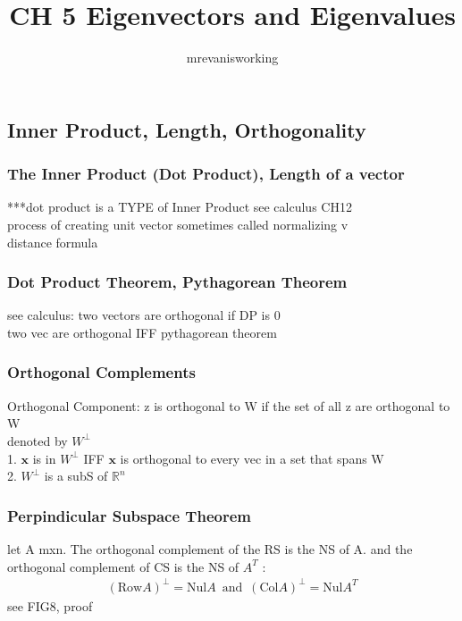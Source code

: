 \documentclass[12pt]{article}
\newcommand{\R}{\mathbb{R}}
\begin{document}
\title{CH 5 Eigenvectors and Eigenvalues}
\author{mrevanisworking}
\maketitle

\subsection{Inner Product, Length, Orthogonality}
    \subsubsection{The Inner Product (Dot Product), Length of a vector}
        ***dot product is a TYPE of Inner Product
        see calculus CH12\\
        process of creating unit vector sometimes called
        normalizing v\\
        distance formula 
    \subsubsection{Dot Product Theorem, Pythagorean Theorem}
        see calculus: two vectors are orthogonal if DP is 0 \\
        two vec are orthogonal IFF pythagorean theorem
    \subsubsection{Orthogonal Complements}
        Orthogonal Component: z is orthogonal to W if the set of all 
        z are orthogonal to W \\
        denoted by $W^\perp$ \\
        1. $\bm{x}$  is in $W^\perp$  IFF $\bm{x}$  is orthogonal to
        every vec in a set that spans W \\
        2. $W^{\perp}$  is a subS of $\R^n$  
    \subsubsection{Perpindicular Subspace Theorem}
        let A mxn. The orthogonal complement of the RS is the
        NS of A. and the orthogonal complement of CS is the NS of $A^T$ :
        \begin{align*}
            (\text{Row}A)^\perp = \text{Nul}A\,\,\,
            \text{and}\,\,\,
            (\text{Col}A)^\perp = \text{Nul}A^T
        \end{align*}
        see FIG8, proof
\end{document}
